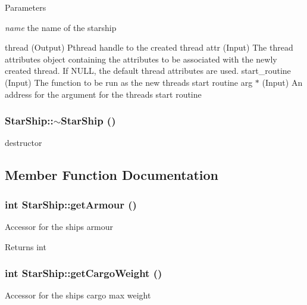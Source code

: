 \begin{DoxyParams}{Parameters}
\item[{\em name}]the name of the starship \end{DoxyParams}


thread (Output) Pthread handle to the created thread attr (Input) The thread attributes object containing the attributes to be associated with the newly created thread. If NULL, the default thread attributes are used. start\_\-routine (Input) The function to be run as the new threads start routine arg $\ast$ (Input) An address for the argument for the threads start routine

\hypertarget{classStarShip_a334de38a2a083eeaf2e509f403db3124}{
\subsubsection[{$\sim$StarShip}]{\setlength{\rightskip}{0pt plus 5cm}StarShip::$\sim$StarShip ()}}
\label{da/d97/classStarShip_a334de38a2a083eeaf2e509f403db3124}
destructor 

\subsection{Member Function Documentation}
\hypertarget{classStarShip_aaa27c8e41243ff314a53aa7d1c625456}{
\subsubsection[{getArmour}]{\setlength{\rightskip}{0pt plus 5cm}int StarShip::getArmour ()}}
\label{da/d97/classStarShip_aaa27c8e41243ff314a53aa7d1c625456}
Accessor for the ships armour

\begin{DoxyReturn}{Returns}
int 
\end{DoxyReturn}
\hypertarget{classStarShip_ac166ff73eb10a460810bfe3c190a24e3}{
\subsubsection[{getCargoWeight}]{\setlength{\rightskip}{0pt plus 5cm}int StarShip::getCargoWeight ()}}
\label{da/d97/classStarShip_ac166ff73eb10a460810bfe3c190a24e3}
Accessor for the ships cargo max weight

